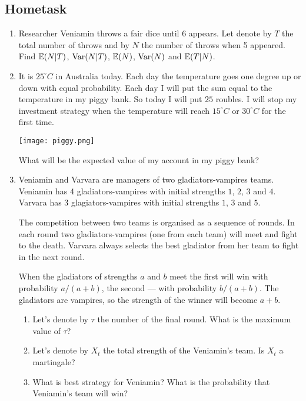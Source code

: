 \documentclass[12pt, a4paper]{article}
\begin{document}
\subsection{Hometask}

\begin{enumerate}

\item Researcher Veniamin throws a fair dice until 6 appears. Let denote by $T$ the total number of throws and by $N$ the number of throws when 5 appeared. Find $\mathbb{E}(N | T)$, $\operatorname{Var}(N | T)$, $\mathbb{E}(N)$, $\operatorname{Var}(N)$ and $\mathbb{E}(T|N)$.



\item It is $25^\circ C$ in Australia today. Each day the temperature goes one degree up or down with equal probability. Each day I will put the sum equal to the temperature in my piggy bank. So today I will put $25$ roubles. I will stop my investment strategy when the temperature will reach $15^\circ C$ or $30^\circ C$ for the first time.

\texttt{[image: piggy.png]}

What will be the expected value of my account in my piggy bank?

\item Veniamin and Varvara are managers of two gladiators-vampires teams. Veniamin has 4 gladiators-vampires with initial strengths $1$, $2$, $3$ and $4$. Varvara has 3 glagiators-vampires with initial strengths $1$, $3$ and $5$.

The competition between two teams is organised as a sequence of rounds. In each round two gladiators-vampires (one from each team) will meet and fight to the death. Varvara always selects the best gladiator from her team to fight in the next round.

When the gladiators of strengths $a$ and $b$ meet the first will win with probability $a/(a+b)$, the second — with probability $b/(a+b)$. The gladiators are vampires, so the strength of the winner will become $a+b$.

\begin{enumerate}
\item Let's denote by $\tau$ the number of the final round. What is the maximum value of $\tau$?
\item Let's denote by $X_t$ the total strength of the Veniamin's team. Is $X_t$ a martingale?
\item What is best strategy for Veniamin? What is the probability that Veniamin's team will win?
\end{enumerate}



\end{enumerate}
\end{document}
